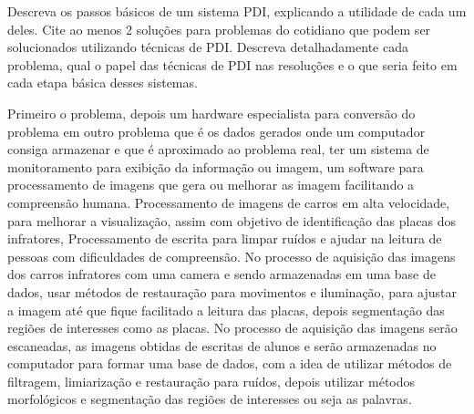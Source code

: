 \documentclass[12pt,a4paper]{article}
\begin{document}
\begin{question}{0.34}
Descreva os passos básicos de um sistema PDI, explicando a utilidade de cada um
deles. Cite ao menos 2 soluções para problemas do cotidiano que podem ser
solucionados utilizando técnicas de PDI. Descreva detalhadamente cada problema,
qual o papel das técnicas de PDI nas resoluções e o que seria feito em cada
etapa básica desses sistemas.
\end{question}
\begin{solution}
Primeiro o problema, depois um hardware especialista para conversão do problema
em outro problema que é os dados gerados onde um computador consiga armazenar e
que é aproximado ao problema real, ter um sistema de monitoramento para exibição
da informação ou imagem, um software para processamento de imagens que gera ou
melhorar as imagem facilitando a compreensão humana.
Processamento de imagens de carros em alta velocidade, para melhorar a
visualização, assim com objetivo de identificação das placas dos infratores, 
Processamento de escrita para limpar ruídos e ajudar na leitura de pessoas com
dificuldades de compreensão.
No processo de aquisição das imagens dos carros infratores com uma camera 
e sendo armazenadas em uma base de dados, usar métodos de restauração para
movimentos e iluminação, para ajustar a imagem até que fique facilitado a
leitura das placas, depois segmentação das regiões de interesses como as placas.
No processo de aquisição das imagens serão escaneadas, as imagens obtidas de
escritas de alunos e serão armazenadas no computador para formar uma base de
dados, com a idea de utilizar métodos de filtragem, limiarização e restauração
para ruídos, depois utilizar métodos morfológicos e segmentação das regiões de
interesses ou seja as palavras.
\end{solution}


\pagebreak
\medskip
\printbibliography[
    heading=bibintoc,
    title={Referências Bibliográficas}
]
\end{document}
